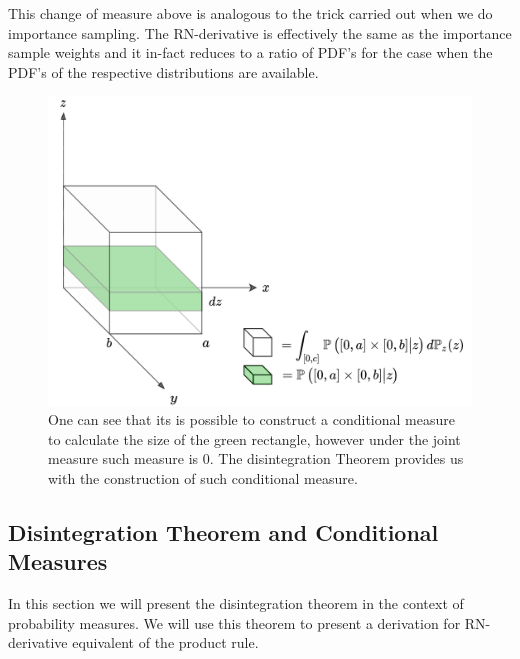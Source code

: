 \documentclass[a4paper,12pt,twoside,openright]{report}
\theoremstyle{definition}
\begin{document}
This change of measure above is analogous to the trick carried out when we do importance sampling. The RN-derivative is effectively the same as the importance sample weights and it in-fact reduces to a ratio of PDF's for the case when the PDF's of the respective distributions are available.
\begin{figure}[t!]
    \centering
    \includegraphics[scale=0.5]{images/disint2.png}
    \caption{ One can see that its is possible to construct a conditional measure to calculate the size of the green rectangle, however under the joint measure such measure is $0$. The disintegration Theorem provides us with the construction of such conditional measure.}
    \label{fig:disintegration}
\end{figure}
\subsection{Disintegration Theorem and Conditional Measures}

In this section we will present the disintegration theorem in the context of probability measures. We will use this theorem to present a derivation for RN-derivative equivalent of the product rule.
\end{document}
